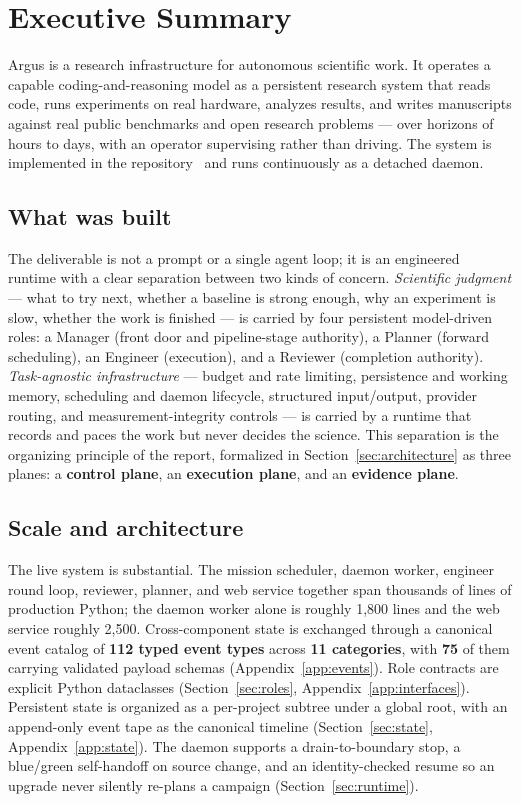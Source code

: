 \section{Executive Summary}
\label{sec:summary}

Argus is a research infrastructure for autonomous scientific work. It operates a
capable coding-and-reasoning model as a persistent research system that reads
code, runs experiments on real hardware, analyzes results, and writes
manuscripts against real public benchmarks and open research problems --- over
horizons of hours to days, with an operator supervising rather than driving. The
system is implemented in the  repository~\cite{argus_repo} and
runs continuously as a detached daemon.

\subsection{What was built}

The deliverable is not a prompt or a single agent loop; it is an engineered
runtime with a clear separation between two kinds of concern. \emph{Scientific
judgment} --- what to try next, whether a baseline is strong enough, why an
experiment is slow, whether the work is finished --- is carried by four
persistent model-driven roles: a Manager (front door and pipeline-stage
authority), a Planner (forward scheduling), an Engineer (execution), and a
Reviewer (completion authority). \emph{Task-agnostic infrastructure} --- budget
and rate limiting, persistence and working memory, scheduling and daemon
lifecycle, structured input/output, provider routing, and measurement-integrity
controls --- is carried by a runtime that records and paces the work but never
decides the science. This separation is the organizing principle of the report,
formalized in Section~\ref{sec:architecture} as three planes: a
\textbf{control plane}, an \textbf{execution plane}, and an \textbf{evidence
plane}.

\subsection{Scale and architecture}

The live system is substantial. The mission scheduler, daemon worker, engineer
round loop, reviewer, planner, and web service together span thousands of lines
of production Python; the daemon worker alone is roughly 1{,}800 lines and the
web service roughly 2{,}500. Cross-component state is exchanged through a
canonical event catalog of \textbf{112 typed event types} across
\textbf{11 categories}, with \textbf{75} of them carrying validated payload
schemas (Appendix~\ref{app:events}). Role contracts are explicit Python
dataclasses (Section~\ref{sec:roles}, Appendix~\ref{app:interfaces}). Persistent
state is organized as a per-project subtree under a global root, with an
append-only event tape as the canonical timeline
(Section~\ref{sec:state}, Appendix~\ref{app:state}). The daemon supports a
drain-to-boundary stop, a blue/green self-handoff on source change, and an
identity-checked resume so an upgrade never silently re-plans a campaign
(Section~\ref{sec:runtime}).

